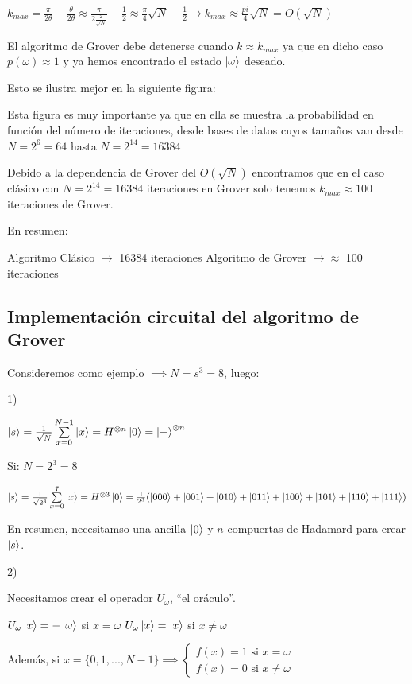 \documentclass[11pt, spanish]{report}
\begin{document}
$k_{max} = \frac{\pi}{2\theta} - \frac{\theta}{2\theta} \approx \frac{\pi}{2
  \frac{2}{\sqrt{N}}} - \frac{1}{2} \approx \frac{\pi}{4} \sqrt{N} - \frac{1}{2}
\rightarrow k_{max} \approx \frac{pi}{4} \sqrt{N} = O(\sqrt{N})$

El algoritmo de Grover debe detenerse cuando $k \approx k_{max}$ ya que en dicho
caso $p(\omega) \approx 1$ y ya hemos encontrado el estado $\ket{\omega}$
deseado.

Esto se ilustra mejor en la siguiente figura:


Esta figura es muy importante ya que en ella se muestra la probabilidad en
función del número de iteraciones, desde bases de datos cuyos tamaños van desde
$N = 2^6 = 64$ hasta $N = 2^{14} = 16384$

Debido a la dependencia de Grover del $O(\sqrt{N})$ encontramos que en el caso
clásico con $N = 2^{14} = 16384$ iteraciones en Grover solo tenemos $k_{max}
\approx 100$ iteraciones de Grover.

En resumen:

Algoritmo Clásico $\rightarrow$ 16384 iteraciones
Algoritmo de Grover $\rightarrow \approx$ 100 iteraciones

\subsection{Implementación circuital del algoritmo de Grover}

Consideremos como ejemplo $\implies N = s^3 = 8$, luego:

1)

$\ket{s} = \frac{1}{\sqrt{N}} \sum\limits_{x=0}^{N-1} \ket{x} = H^{\otimes n}
\ket{0} = \ket{+}^{\otimes n}$

Si: $N = 2^3 = 8$

$\ket{s} = \frac{1}{\sqrt{2^3}} \sum\limits_{x=0}^{7} \ket{x} = H^{\otimes 3}
\ket{0} = \frac{1}{2^3} (\ket{000} + \ket{001} + \ket{010} + \ket{011} + \ket{100} + \ket{101} + \ket{110} + \ket{111})$

En resumen, necesitamso una ancilla $\ket{0}$ y $n$ compuertas de Hadamard para
crear $\ket{s}$.

2)

Necesitamos crear el operador $U_\omega$, ``el oráculo''.

$U_\omega \ket{x} = -\ket{\omega}$ si $x = \omega$
$U_\omega \ket{x} = \ket{x}$ si $x \neq \omega$

Además, si $x = \{0, 1, ... , N-1\} \implies \begin{cases} f(x) = 1 \text{ si }
  x = \omega \\ f(x) = 0 \text{ si } x \neq \omega \end{cases}$
\end{document}
